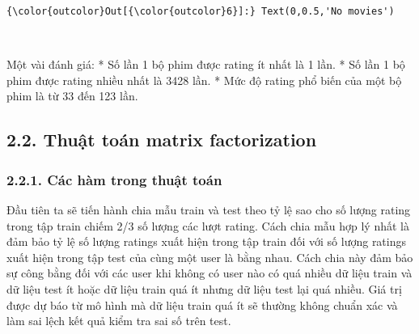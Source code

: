 \documentclass[11pt]{article}
\begin{document}
            \begin{Verbatim}[commandchars=\\\{\}]
{\color{outcolor}Out[{\color{outcolor}6}]:} Text(0,0.5,'No movies')
\end{Verbatim}
        
    \begin{center}
    \end{center}
    { \hspace*{\fill} \\}
    
    Một vài đánh giá: * Số lần 1 bộ phim được rating ít nhất là 1 lần. * Số
lần 1 bộ phim được rating nhiều nhất là 3428 lần. * Mức độ rating phổ
biến của một bộ phim là từ 33 đến 123 lần.

\subsection{2.2. Thuật toán matrix
factorization}\label{thuux1eadt-touxe1n-matrix-factorization}

\subsubsection{2.2.1. Các hàm trong thuật
toán}\label{cuxe1c-huxe0m-trong-thuux1eadt-touxe1n}

Đầu tiên ta sẽ tiến hành chia mẫu train và test theo tỷ lệ sao cho số
lượng rating trong tập train chiếm 2/3 số lượng các lượt rating. Cách
chia mẫu hợp lý nhất là đảm bảo tỷ lệ số lượng ratings xuất hiện trong
tập train đối với số lượng ratings xuất hiện trong tập test của cùng một
user là bằng nhau. Cách chia này đảm bảo sự công bằng đối với các user
khi không có user nào có quá nhiều dữ liệu train và dữ liệu test ít hoặc
dữ liệu train quá ít nhưng dữ liệu test lại quá nhiều. Giá trị được dự
báo từ mô hình mà dữ liệu train quá ít sẽ thường không chuẩn xác và làm
sai lệch kết quả kiểm tra sai số trên test.
\end{document}
